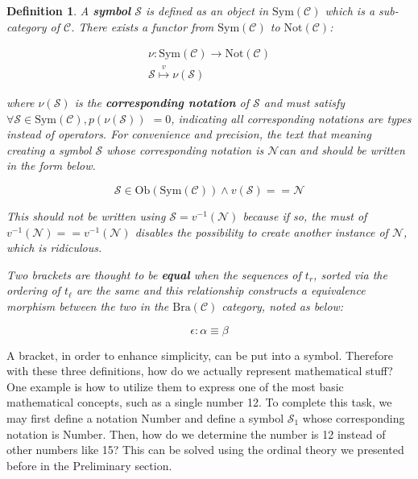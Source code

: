 \documentclass{aims}
\numberwithin{equation}{section}
\newtheorem{definition}{Definition}	%
\numberwithin{theorem}{section}	%
\numberwithin{axiom}{section}	%
\numberwithin{definition}{section}	%
\begin{document}
	\begin{definition}
		A \textbf{ symbol} \(\mathcal{S}\) is defined as an object in \(\text{Sym}(\mathcal{C})\) which is a sub-category of \(\mathcal{C}\). There exists a functor from \(\text{Sym}(\mathcal{C})\) to \(\text{Not}(\mathcal{C})\):
		
		\begin{equation}
			\begin{gathered}
				\nu :\text{Sym}(\mathcal{C})\to \text{Not}(\mathcal{C})\\
				\mathcal{S}\overset{\mathit{v}}{\mapsto }\nu (\mathcal{S})
			\end{gathered}
		\end{equation}
		
		\noindent where \(\nu (\mathcal{S})\) is the \textbf{ corresponding notation} of \(\mathcal{S}\) and must satisfy \(\forall \mathcal{S}\in \text{Sym}(\mathcal{C}),\mathit{p}(\nu (\mathcal{S}))\) \(= 0\), indicating all corresponding notations are types instead of operators. For convenience and precision, the text that meaning creating a symbol \(\mathcal{S}\) whose corresponding notation is \(\mathcal{N}\)can and should be written in the form below.
		
		\begin{equation}
			\mathcal{S}\in \text{Ob}(\text{Sym}(\mathcal{C}))\land \mathit{v}(\mathcal{S})==\mathcal{N}
		\end{equation}
		
		This should not be written using \(\mathcal{S}=\mathit{v}^{-1}(\mathcal{N})\) because if so, the must of \(\mathit{v}^{-1}(\mathcal{N})==\mathit{v}^{-1}(\mathcal{N})\) disables the possibility to create another instance of \(\mathcal{N}\), which is ridiculous. 
		
		Two brackets are thought to be \textbf{ equal} when the sequences of \(t_{\mathit{r}}\), sorted via the ordering of \(t_{\ell }\) are the same and this relationship constructs a equivalence morphism between the two in the \(\text{Bra}(\mathcal{C})\) category, noted as below:
		
		\begin{equation}
			\epsilon :\alpha \equiv \beta
		\end{equation}
	\end{definition}
	
	A bracket, in order to enhance simplicity, can be put into a symbol. Therefore with these three definitions, how do we actually represent mathematical stuff? One example is how to utilize them to express one of the most basic mathematical concepts, such as a single number 12. To complete this task, we may first define a notation Number and define a symbol \(\mathcal{S}_1\) whose corresponding notation is Number. Then, how do we determine the number is 12 instead of other numbers like 15? This can be solved using the ordinal theory we presented before in the Preliminary section.
	
\end{document}
